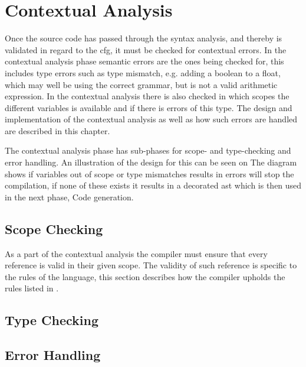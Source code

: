 \chapter{Contextual Analysis}
Once the source code has passed through the syntax analysis, and thereby is validated in regard to the \acrshort{cfg}, it must be checked for contextual errors.
In the contextual analysis phase semantic errors are the ones being checked for, this includes type errors such as type mismatch, e.g. adding a boolean to a float, which may well be using the correct grammar, but is not a valid arithmetic expression.
In the contextual analysis there is also checked in which scopes the different variables is available and if there is errors of this type.
The design and implementation of the contextual analysis as well as how such errors are handled are described in this chapter.

The contextual analysis phase has sub-phases for scope- and type-checking and error handling.
An illustration of the design for this can be seen on 
The diagram shows if variables out of scope or type mismatches results in errors will stop the compilation, if none of these exists it results in a decorated \acrshort{ast} which is then used in the next phase, Code generation.




%


\section{Scope Checking}
As a part of the contextual analysis the compiler must ensure that every reference is valid in their given scope.
The validity of such reference is specific to the rules of the language, this section describes how the compiler upholds the rules listed in .


\section{Type Checking}


\section{Error Handling}
